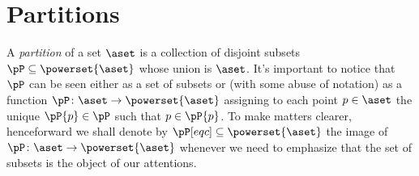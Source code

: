 \documentclass[../main]{subfiles}
\begin{document}

\section{Partitions}
A \emph{partition} of a set \(\aset\) is a collection of disjoint subsets \(\pP \subseteq \powerset{\aset}\) whose union is \(\aset\). It's important to notice that \(\pP\) can be seen either as a set of subsets or (with some abuse of notation) as a function \(\pP \colon \aset \to \powerset{\aset}\) assigning to each point \(p \in \aset\) the unique \(\pP{p} \in \pP\) such that \(p \in \pP{p}\). To make matters clearer, henceforward we shall denote by \(\pP[eqc] \subseteq \powerset{\aset}\) the image of \(\pP \colon \aset \to \powerset{\aset}\) whenever we need to emphasize that the set of subsets is the object of our attentions.
\end{document}
